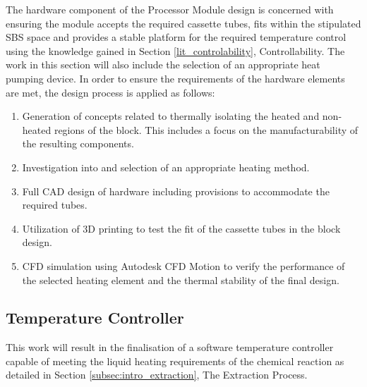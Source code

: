 The hardware component of the Processor Module design is concerned with ensuring the module accepts the required cassette tubes, fits within the stipulated SBS space and provides a stable platform for the required temperature control using the knowledge gained in Section \ref{lit_controlability}, Controllability. The work in this section will also include the selection of an appropriate heat pumping device. In order to ensure the requirements of the hardware elements are met, the design process is applied as follows:
\begin{enumerate}
	\item Generation of concepts related to thermally isolating the heated and non-heated regions of the block. This includes a focus on the manufacturability of the resulting components.
	\item Investigation into and selection of an appropriate heating method.
	\item Full CAD design of hardware including provisions to accommodate the required tubes.
	\item Utilization of 3D printing to test the fit of the cassette tubes in the block design.
	\item CFD simulation using Autodesk CFD Motion to verify the performance of the selected heating element and the thermal stability of the final design. 
\end{enumerate} 

\subsection{Temperature Controller}
\label{Method_controller}

This work will result in the finalisation of a software temperature controller capable of meeting the liquid heating requirements of the chemical reaction as detailed in Section \ref{subsec:intro_extraction}, The Extraction Process.

